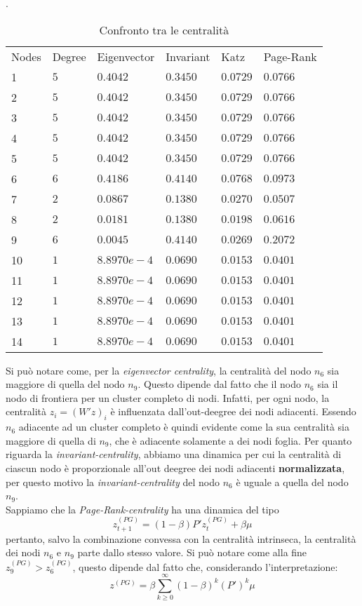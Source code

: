 \begin{alphaparts}
    \questionpart

\begin{table}[htb]
    \centering
    \caption{Confronto tra le centralità}.
    \begin{tabular}{llllll}
     Nodes & Degree & Eigenvector & Invariant & Katz & Page-Rank \\
    1 & $5$ & $0.4042$ & $0.3450$ & $0.0729$ & $0.0766$\\
    2 & $5$ & $0.4042$ & $0.3450$ & $0.0729$ & $0.0766$\\
    3 & $5$ & $0.4042$ & $0.3450$ & $0.0729$ & $0.0766$\\
    4 & $5$ & $0.4042$ & $0.3450$ & $0.0729$ & $0.0766$\\
    5 & $5$ & $0.4042$ & $0.3450$ & $0.0729$ & $0.0766$\\
    6 & $6$ & $0.4186$ & $0.4140$ & $0.0768$ & $0.0973$\\
    7 & $2$ & $0.0867$ & $0.1380$ & $0.0270$ & $0.0507$\\
    8 & $2$ & $0.0181$ & $0.1380$ & $0.0198$ & $0.0616$\\
    9 & $6$ & $0.0045$ & $0.4140$ & $0.0269$ & $0.2072$\\
    10 & $1$ & $8.8970e-4$ & $0.0690$ & $0.0153$ & $0.0401$\\
    11 & $1$ & $8.8970e-4$ & $0.0690$ & $0.0153$ & $0.0401$\\
    12 & $1$ & $8.8970e-4$ & $0.0690$ & $0.0153$ & $0.0401$\\
    13 & $1$ & $8.8970e-4$ & $0.0690$ & $0.0153$ & $0.0401$\\
    14 & $1$ & $8.8970e-4$ & $0.0690$ & $0.0153$ & $0.0401$\\
    \end{tabular}
 \end{table}
    
    
    Si può notare come, per la \textit{eigenvector centrality}, la centralità del nodo \(n_6\) sia maggiore di quella del nodo \(n_9\). Questo dipende dal fatto che il nodo \(n_6\) sia il nodo di frontiera per un cluster completo di nodi. Infatti, per ogni nodo, la centralità \(z_i= (W'z)_i\) è influenzata dall'out-deegree dei nodi adiacenti. Essendo \(n_6\) adiacente ad un cluster completo è quindi evidente come la sua centralità sia maggiore di quella di \(n_9\), che è adiacente solamente a dei nodi foglia. Per quanto riguarda la \textit{invariant-centrality}, abbiamo una dinamica per cui la centralità di ciascun nodo è proporzionale all'out deegree dei nodi adiacenti \textbf{normalizzata}, per questo motivo la \textit{invariant-centrality} del nodo \(n_6\) è uguale a quella del nodo \(n_9\). \\
    Sappiamo che la \textit{Page-Rank-centrality} ha una dinamica del tipo 
    \[z^{(PG)}_{t+ 1} = (1- \beta)P'z^{(PG)}_{t} + \beta\mu\] 
    pertanto, salvo la combinazione convessa con la centralità intrinseca, la centralità dei nodi \(n_6\) e \(n_9\) parte dallo stesso valore. Si può notare come alla fine \(z^{(PG)}_9>z^{(PG)}_6\), questo dipende dal fatto che, considerando l'interpretazione:
    \[z^{(PG)} = \beta  \sum \limits_{k \geq 0}^{\infty} (1- \beta)^k (P')^k \mu\]


\end{alphaparts}
